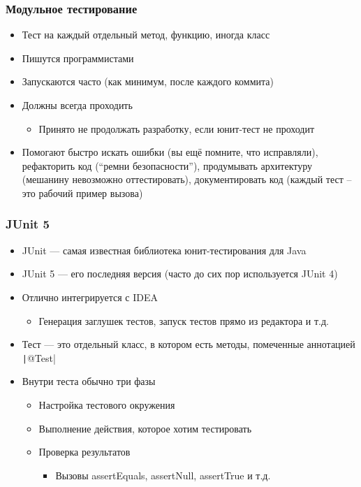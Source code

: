 \documentclass[xetex,mathserif,serif]{beamer}
\begin{document}
	\begin{frame}
		\frametitle{Модульное тестирование}
		\begin{itemize}
			\item Тест на каждый отдельный метод, функцию, иногда класс
			\item Пишутся программистами
			\item Запускаются часто (как минимум, после каждого коммита)
			\item Должны всегда проходить
			\begin{itemize}
				\item Принято не продолжать разработку, если юнит-тест не проходит
			\end{itemize}
			\item Помогают быстро искать ошибки (вы ещё помните, что исправляли), рефакторить код (``ремни безопасности''), продумывать архитектуру (мешанину невозможно оттестировать), документировать код (каждый тест -- это рабочий пример вызова)
		\end{itemize}
	\end{frame}

	\begin{frame}
		\frametitle{JUnit 5}
		\begin{itemize}
			\item JUnit --- самая известная библиотека юнит-тестирования для Java
			\item JUnit 5 --- его последняя версия (часто до сих пор используется JUnit 4)
			\item Отлично интегрируется с IDEA
			\begin{itemize}
				\item Генерация заглушек тестов, запуск тестов прямо из редактора и т.д.
			\end{itemize}
			\item Тест --- это отдельный класс, в котором есть методы, помеченные аннотацией \texttt|@Test|
			\item Внутри теста обычно три фазы
			\begin{itemize}
				\item Настройка тестового окружения
				\item Выполнение действия, которое хотим тестировать
				\item Проверка результатов
				\begin{itemize}
					\item Вызовы assertEquals, assertNull, assertTrue и т.д.
				\end{itemize}
			\end{itemize}
		\end{itemize}
	\end{frame}
\end{document}

